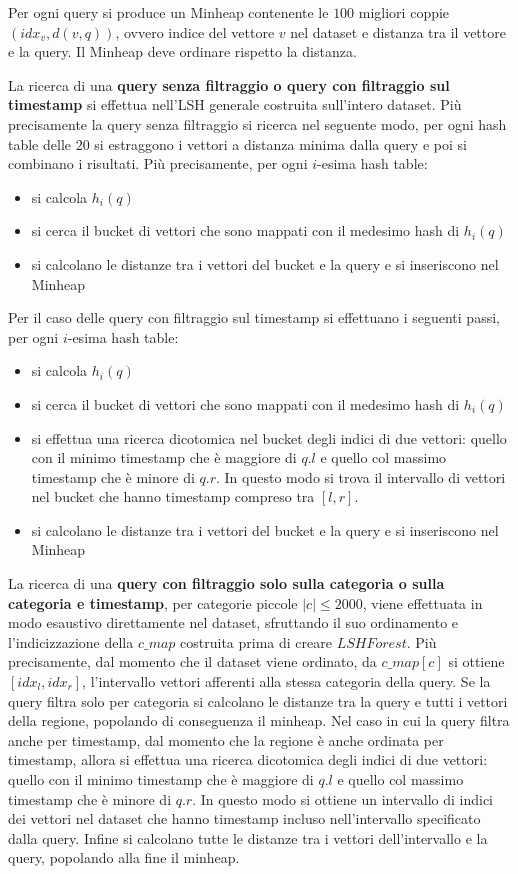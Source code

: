Per ogni query si produce un Minheap contenente le $100$ migliori coppie 
$(idx_v, d(v,q))$, ovvero indice del vettore $v$ nel dataset e distanza tra il vettore
e la query. Il Minheap deve ordinare rispetto la distanza.

La ricerca di una \textbf{query senza filtraggio o query con filtraggio sul timestamp} 
si effettua nell'LSH generale costruita sull'intero dataset. Più precisamente la 
query senza filtraggio si ricerca nel seguente modo, per ogni hash table 
delle $20$ si estraggono i vettori a distanza minima dalla query e poi si combinano 
i risultati. Più precisamente, per ogni $i$-esima hash table:
\begin{itemize}
    \item si calcola $h_i(q)$
    \item si cerca il bucket di vettori che sono mappati con il medesimo hash 
    di $h_i(q)$
    \item si calcolano le distanze tra i vettori del bucket e la query e si inseriscono
    nel Minheap
\end{itemize}
Per il caso delle query con filtraggio sul timestamp si effettuano i seguenti passi,
per ogni $i$-esima hash table:
\begin{itemize}
    \item si calcola $h_i(q)$
    \item si cerca il bucket di vettori che sono mappati con il medesimo hash 
    di $h_i(q)$
    \item si effettua una ricerca dicotomica nel bucket degli indici di due vettori: quello con 
    il minimo timestamp che è maggiore di $q.l$ e quello col massimo timestamp che 
    è minore di $q.r$. In questo modo si trova il intervallo di vettori nel bucket 
    che hanno timestamp compreso tra $[l,r]$.
    \item si calcolano le distanze tra i vettori del bucket e la query e si inseriscono
    nel Minheap
\end{itemize}

La ricerca di una \textbf{query con filtraggio solo sulla categoria o sulla categoria e timestamp}, 
per categorie piccole $|c|\le 2000$, viene effettuata in modo esaustivo direttamente nel dataset,
sfruttando il suo ordinamento e l'indicizzazione della $c\_map$ costruita 
prima di creare $LSHForest$. 
Più precisamente, dal momento che il dataset viene ordinato, da $c\_map[c]$
si ottiene $[idx_l, idx_r]$, l'intervallo vettori afferenti alla stessa categoria della query. 
Se la query filtra solo per categoria si calcolano le distanze tra la query e tutti 
i vettori della regione, popolando di conseguenza il minheap. 
Nel caso in cui la query filtra anche per timestamp, 
dal momento che la regione è anche ordinata per timestamp, allora si effettua 
una ricerca dicotomica degli indici di due vettori: quello con il minimo timestamp che è 
maggiore di $q.l$ e quello col massimo timestamp che è minore di $q.r$.
In questo modo si ottiene un intervallo 
di indici dei vettori nel dataset che hanno timestamp incluso 
nell'intervallo specificato dalla query. Infine si calcolano tutte le distanze 
tra i vettori dell'intervallo e la query, popolando alla fine il minheap.

